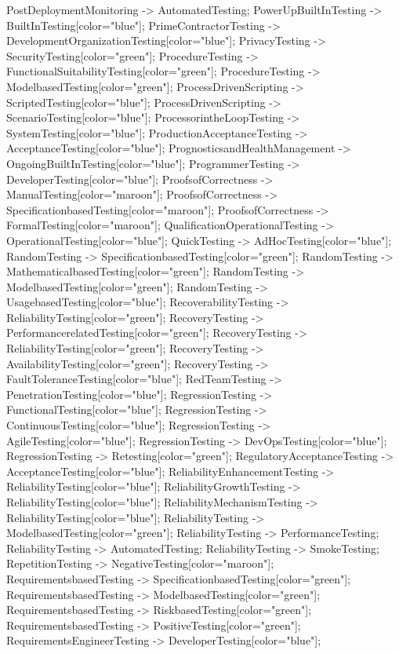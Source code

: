 \documentclass{article}
\begin{document}
{PostDeploymentMonitoring -> AutomatedTesting;
PowerUpBuiltInTesting -> BuiltInTesting[color="blue"];
PrimeContractorTesting -> DevelopmentOrganizationTesting[color="blue"];
PrivacyTesting -> SecurityTesting[color="green"];
ProcedureTesting -> FunctionalSuitabilityTesting[color="green"];
ProcedureTesting -> ModelbasedTesting[color="green"];
ProcessDrivenScripting -> ScriptedTesting[color="blue"];
ProcessDrivenScripting -> ScenarioTesting[color="blue"];
ProcessorintheLoopTesting -> SystemTesting[color="blue"];
ProductionAcceptanceTesting -> AcceptanceTesting[color="blue"];
PrognosticsandHealthManagement -> OngoingBuiltInTesting[color="blue"];
ProgrammerTesting -> DeveloperTesting[color="blue"];
ProofsofCorrectness -> ManualTesting[color="maroon"];
ProofsofCorrectness -> SpecificationbasedTesting[color="maroon"];
ProofsofCorrectness -> FormalTesting[color="maroon"];
QualificationOperationalTesting -> OperationalTesting[color="blue"];
QuickTesting -> AdHocTesting[color="blue"];
RandomTesting -> SpecificationbasedTesting[color="green"];
RandomTesting -> MathematicalbasedTesting[color="green"];
RandomTesting -> ModelbasedTesting[color="green"];
RandomTesting -> UsagebasedTesting[color="blue"];
RecoverabilityTesting -> ReliabilityTesting[color="green"];
RecoveryTesting -> PerformancerelatedTesting[color="green"];
RecoveryTesting -> ReliabilityTesting[color="green"];
RecoveryTesting -> AvailabilityTesting[color="green"];
RecoveryTesting -> FaultToleranceTesting[color="blue"];
RedTeamTesting -> PenetrationTesting[color="blue"];
RegressionTesting -> FunctionalTesting[color="blue"];
RegressionTesting -> ContinuousTesting[color="blue"];
RegressionTesting -> AgileTesting[color="blue"];
RegressionTesting -> DevOpsTesting[color="blue"];
RegressionTesting -> Retesting[color="green"];
RegulatoryAcceptanceTesting -> AcceptanceTesting[color="blue"];
ReliabilityEnhancementTesting -> ReliabilityTesting[color="blue"];
ReliabilityGrowthTesting -> ReliabilityTesting[color="blue"];
ReliabilityMechanismTesting -> ReliabilityTesting[color="blue"];
ReliabilityTesting -> ModelbasedTesting[color="green"];
ReliabilityTesting -> PerformanceTesting;
ReliabilityTesting -> AutomatedTesting;
ReliabilityTesting -> SmokeTesting;
RepetitionTesting -> NegativeTesting[color="maroon"];
RequirementsbasedTesting -> SpecificationbasedTesting[color="green"];
RequirementsbasedTesting -> ModelbasedTesting[color="green"];
RequirementsbasedTesting -> RiskbasedTesting[color="green"];
RequirementsbasedTesting -> PositiveTesting[color="green"];
RequirementsEngineerTesting -> DeveloperTesting[color="blue"];
}
\end{document}
